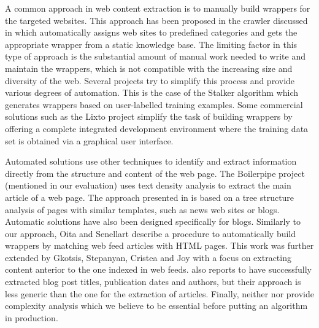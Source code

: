 A common approach in web content extraction is to manually build wrappers for the targeted websites. This approach has been proposed in the crawler discussed in \cite{faheem2012intelligent} which automatically assigns web sites to predefined categories and gets the appropriate wrapper from a static knowledge base. The limiting factor in this type of approach is the substantial amount of manual work needed to write and maintain the wrappers, which is not compatible with the increasing size and diversity of the web. Several projects try to simplify this process and provide various degrees of automation. This is the case of the Stalker algorithm \cite{stalker} which generates wrappers based on user-labelled training examples. Some commercial solutions such as the Lixto project \cite{lixto} simplify the task of building wrappers by offering a complete integrated development environment where the training data set is obtained via a graphical user interface.

Automated solutions use other techniques to identify and extract information directly from the structure and content of the web page. The Boilerpipe project \cite{kohlschuetter2010} (mentioned in our evaluation) uses text density analysis to extract the main article of a web page. The approach presented in \cite{treeedit} is based on a tree structure analysis of pages with similar templates, such as news web sites or blogs. Automatic solutions have also been designed specifically for blogs. Similarly to our approach, Oita and Senellart \cite{oita2010} describe a procedure to automatically build wrappers by matching web feed articles with HTML pages. This work was further extended by Gkotsis, Stepanyan, Cristea and Joy \cite{gkotsis2013} with a focus on extracting content anterior to the one indexed in web feeds. \cite{gkotsis2013} also reports to have successfully extracted blog post titles, publication dates and authors, but their approach is less generic than the one for the extraction of articles. Finally, neither \cite{oita2010} nor \cite{gkotsis2013} provide complexity analysis which we believe to be essential before putting an algorithm in production.

